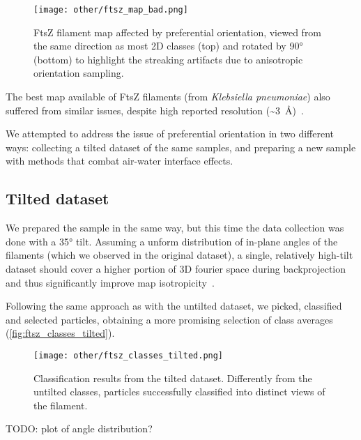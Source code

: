\begin{figure}[ht]
    \centering
    \texttt{[image: other/ftsz\_map\_bad.png]}
    \caption[FtsZ filament: anisotropic map]{FtsZ filament map affected by preferential orientation, viewed from the same direction as most 2D classes (top) and rotated by \ang{90} (bottom) to highlight the streaking artifacts due to anisotropic orientation sampling.}
    \label{fig:ftsz_map_bad}
\end{figure}

The best map available of FtsZ filaments (from \textit{Klebsiella pneumoniae}) also suffered from similar issues, despite high reported resolution (\sim\qty{3}{\angstrom})~\cite{fujitaStructuresFtsZSingle2023}.

We attempted to address the issue of preferential orientation in two different ways: collecting a tilted dataset of the same samples, and preparing a new sample with methods that combat air-water interface effects.

\subsection{Tilted dataset}\label{ftsz_tilted}

We prepared the sample in the same way, but this time the data collection was done with a \ang{35} tilt.
Assuming a unform distribution of in-plane angles of the filaments (which we observed in the original dataset), a single, relatively high-tilt dataset should cover a higher portion of 3D fourier space during backprojection and thus significantly improve map isotropicity~\cite{tanAddressingPreferredSpecimen2017}.

Following the same approach as with the untilted dataset, we picked, classified and selected particles, obtaining a more promising selection of class averages (\autoref{fig:ftsz_classes_tilted}).

\begin{figure}[ht]
    \centering
    \texttt{[image: other/ftsz\_classes\_tilted.png]}
    \caption[FtsZ tilted dataset: 2D classes]{Classification results from the tilted dataset. Differently from the untilted classes, particles successfully classified into distinct views of the filament.}
    \label{fig:ftsz_classes_tilted}
\end{figure}

TODO: plot of angle distribution?

